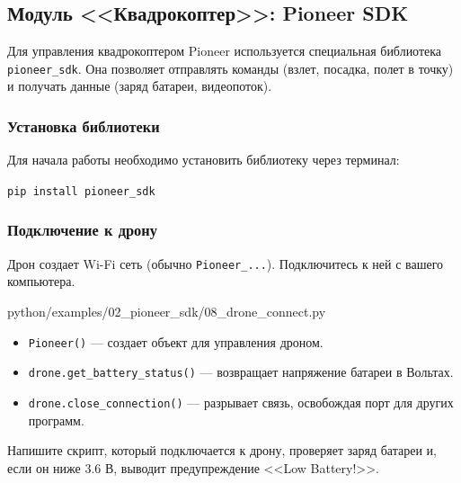\subsection{Модуль <<Квадрокоптер>>: Pioneer SDK}

Для управления квадрокоптером Pioneer используется специальная библиотека \texttt{pioneer\_sdk}. Она позволяет отправлять команды (взлет, посадка, полет в точку) и получать данные (заряд батареи, видеопоток).

\subsubsection*{Установка библиотеки}
Для начала работы необходимо установить библиотеку через терминал:

\begin{codebox}[Терминал]
\texttt{pip install pioneer\_sdk}
\end{codebox}

\subsubsection*{Подключение к дрону}
Дрон создает Wi-Fi сеть (обычно \texttt{Pioneer\_...}). Подключитесь к ней с вашего компьютера.

\begin{codefile}[python]{python/examples/02_pioneer_sdk/08_drone_connect.py}
\end{codefile}

\begin{itemize}
    \item \texttt{Pioneer()} — создает объект для управления дроном.
    \item \texttt{drone.get\_battery\_status()} — возвращает напряжение батареи в Вольтах.
    \item \texttt{drone.close\_connection()} — разрывает связь, освобождая порт для других программ.
\end{itemize}

\begin{taskbox}[Диагностика]
Напишите скрипт, который подключается к дрону, проверяет заряд батареи и, если он ниже 3.6 В, выводит предупреждение <<Low Battery!>>.
\end{taskbox}

